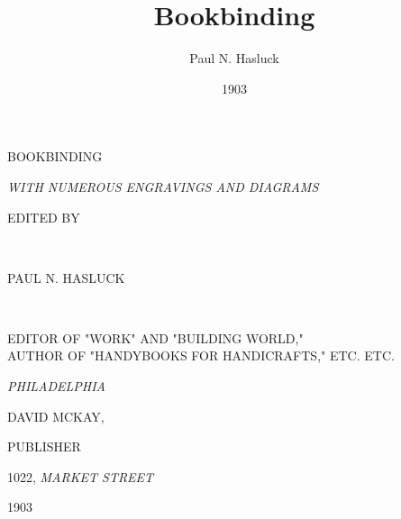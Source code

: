 \documentclass[twoside]{book}
\title{Bookbinding}
\author{Paul N. Hasluck}
\date{1903}
\begin{document}

\setcounter{secnumdepth}{0}

\fancyhf{}
\renewcommand{\headrulewidth}{0pt} %
\fancyhead{}
\fancyfoot{}

\pagestyle{fancy}
\parindent=12pt
\parskip=0pt

\setcounter{page}{3}

\vspace*{\fill}


\begin{center}

\begin{Huge}
BOOKBINDING
\end{Huge}

\vspace*{\fill}

\textit{WITH NUMEROUS ENGRAVINGS AND DIAGRAMS}

\vspace*{\fill}

\begin{small}EDITED BY\end{small} \\

\begin{Large}
PAUL N. HASLUCK
\end{Large}
\\

\begin{tiny}
EDITOR OF "WORK" AND "BUILDING WORLD," \\
AUTHOR OF "HANDYBOOKS FOR HANDICRAFTS," ETC. ETC.
\end{tiny}

\vspace*{\fill}

\textit{PHILADELPHIA}

\begin{Large}DAVID MCKAY,\end{Large} PUBLISHER

1022, \textit{MARKET STREET}

1903

\end{center}
\end{document}
